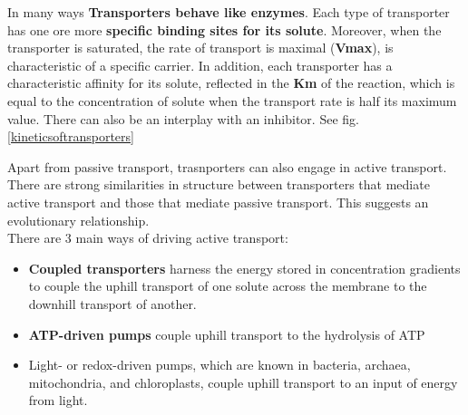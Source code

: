 \documentclass[../main.tex]{subfiles}
\begin{document}
In many ways \textbf{Transporters behave like enzymes}. Each type of transporter has one ore more \textbf{specific binding sites for its solute}. Moreover, when the transporter is saturated, the rate of transport is maximal (\textbf{Vmax}), is characteristic of a specific carrier. In addition, each transporter has a characteristic affinity for its solute, reflected in the \textbf{Km} of the reaction, which is equal to the concentration of solute when the transport rate is half its maximum value. There can also be an interplay with an inhibitor.  See fig. \ref{kineticsoftransporters}
\begin{figure}[H]
	\centering
	\caption{}
\end{figure}


Apart from passive transport, trasnporters can also engage in active transport. There are strong similarities in structure between transporters that mediate active transport and those that mediate passive transport. This suggests an evolutionary relationship. \\
There are 3 main ways of driving active transport: 
\begin{itemize}
	\item \textbf{Coupled transporters} harness the energy stored in concentration gradients to couple the uphill transport of one solute across the membrane to the downhill transport of another. 
	\item \textbf{ATP-driven pumps} couple uphill transport to the hydrolysis of ATP
	\item Light- or redox-driven pumps, which are known in bacteria, archaea, mitochondria, and chloroplasts, couple uphill transport to an input of energy from light.
\end{itemize}
\end{document}
